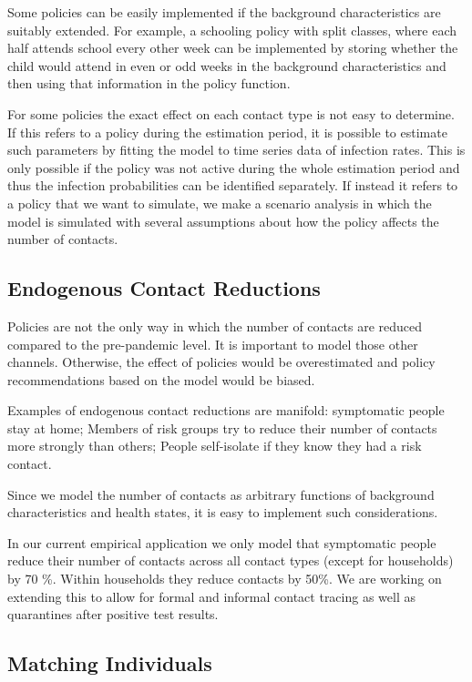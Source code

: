 Some policies can be easily implemented if the background characteristics are suitably extended. For example, a schooling policy with split classes, where each half attends school every other week can be implemented by storing whether the child would attend in even or odd weeks in the background characteristics and then using that information in the policy function.

For some policies the exact effect on each contact type is not easy to determine. If this refers to a policy during the estimation period, it is possible to estimate such parameters by fitting the model to time series data of infection rates. This is only possible if the policy was not active during the whole estimation period and thus the infection probabilities can be identified separately. If instead it refers to a policy that we want to simulate, we make a scenario analysis in which the model is simulated with several assumptions about how the policy affects the number of contacts.


\subsection{Endogenous Contact Reductions}
\label{sec:endogenous_contact_reductions}

Policies are not the only way in which the number of contacts are reduced compared to the pre-pandemic level. It is important to model those other channels. Otherwise, the effect of policies would be overestimated and policy recommendations based on the model would be biased.

Examples of endogenous contact reductions are manifold: symptomatic people stay at home; Members of risk groups try to reduce their number of contacts more strongly than others; People self-isolate if they know they had a risk contact.

Since we model the number of contacts as arbitrary functions of background characteristics and health states, it is easy to implement such considerations.

In our current empirical application we only model that symptomatic people reduce their number of contacts across all contact types (except for households) by 70 \%. Within households they reduce contacts by 50\%. We are working on extending this to allow for formal and informal contact tracing as well as quarantines after positive test results.


\subsection{Matching Individuals}
\label{sec:matching}

